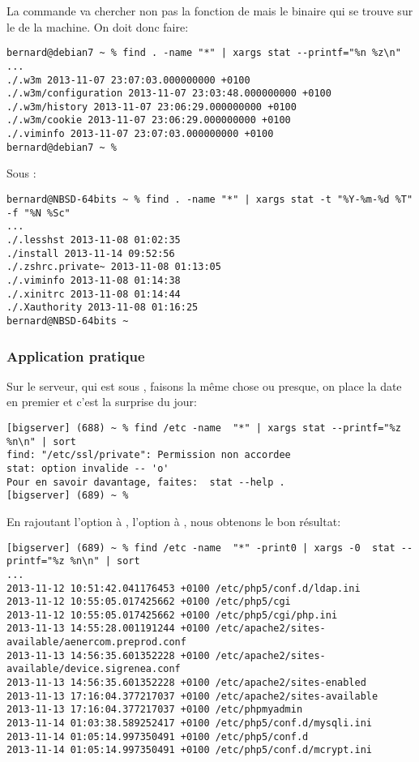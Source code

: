 La commande  va chercher non pas la fonction de \zsh{} mais le binaire qui se trouve sur le  de la machine. On doit donc faire:

\begin{lstlisting}[caption=stat tout rentre dans l'ordre sous Debian]
bernard@debian7 ~ % find . -name "*" | xargs stat --printf="%n %z\n"
...
./.w3m 2013-11-07 23:07:03.000000000 +0100
./.w3m/configuration 2013-11-07 23:03:48.000000000 +0100
./.w3m/history 2013-11-07 23:06:29.000000000 +0100
./.w3m/cookie 2013-11-07 23:06:29.000000000 +0100
./.viminfo 2013-11-07 23:07:03.000000000 +0100
bernard@debian7 ~ %
\end{lstlisting}

Sous \netbsd:

\begin{lstlisting}[caption=stat tout rentre dans l'ordre sous NetBSD]
bernard@NBSD-64bits ~ % find . -name "*" | xargs stat -t "%Y-%m-%d %T" -f "%N %Sc"
...
./.lesshst 2013-11-08 01:02:35
./install 2013-11-14 09:52:56
./.zshrc.private~ 2013-11-08 01:13:05
./.viminfo 2013-11-08 01:14:38
./.xinitrc 2013-11-08 01:14:44
./.Xauthority 2013-11-08 01:16:25
bernard@NBSD-64bits ~
\end{lstlisting}

\subsubsection{Application pratique}
Sur le serveur, qui est sous \linux, faisons la même chose ou presque, on place la date en premier et c'est la surprise du jour:

\begin{lstlisting}[caption=problèmes de droits sous Linux?]
[bigserver] (688) ~ % find /etc -name  "*" | xargs stat --printf="%z %n\n" | sort
find: "/etc/ssl/private": Permission non accordee
stat: option invalide -- 'o'
Pour en savoir davantage, faites:  stat --help .
[bigserver] (689) ~ %
\end{lstlisting}

En rajoutant l'option  à , l'option  à , nous obtenons le bon résultat:

\begin{lstlisting}[caption=problèmes résolus!]
[bigserver] (689) ~ % find /etc -name  "*" -print0 | xargs -0  stat --printf="%z %n\n" | sort
...
2013-11-12 10:51:42.041176453 +0100 /etc/php5/conf.d/ldap.ini
2013-11-12 10:55:05.017425662 +0100 /etc/php5/cgi
2013-11-12 10:55:05.017425662 +0100 /etc/php5/cgi/php.ini
2013-11-13 14:55:28.001191244 +0100 /etc/apache2/sites-available/aenercom.preprod.conf
2013-11-13 14:56:35.601352228 +0100 /etc/apache2/sites-available/device.sigrenea.conf
2013-11-13 14:56:35.601352228 +0100 /etc/apache2/sites-enabled
2013-11-13 17:16:04.377217037 +0100 /etc/apache2/sites-available
2013-11-13 17:16:04.377217037 +0100 /etc/phpmyadmin
2013-11-14 01:03:38.589252417 +0100 /etc/php5/conf.d/mysqli.ini
2013-11-14 01:05:14.997350491 +0100 /etc/php5/conf.d
2013-11-14 01:05:14.997350491 +0100 /etc/php5/conf.d/mcrypt.ini
\end{lstlisting}

